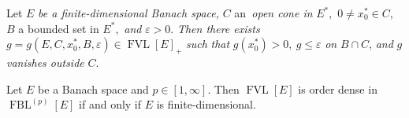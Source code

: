 \documentclass[10pt,a4paper]{amsart}
\begin{document}
\begin{lemma}
\textit{\label{F}}Let $E$ \textit{be a finite-dimensional Banach space, }$C$
an\textit{\ open cone in} $E^{\ast},$ $0\neq x_{0}^{\ast}\in C$, $B$ a bounded
set in $E^{\ast},$ \textit{and }$\varepsilon>0$. \textit{Then there exists}
$g=g\left(  E,C,x_{0}^{\ast},B,\varepsilon\right)  \in\operatorname*{FVL}%
[E]_{+}$ \textit{such} \textit{that} $g(x_{0}^{\ast})>0,\ g\leq\varepsilon$
\textit{on} $B\cap C$, \textit{and} $g$ \textit{vanishes outside} $C$.
\end{lemma}

\begin{theorem}
\label{Main}Let $E$ be a Banach space and $p\in\left[  1,\infty\right]  .$
Then $\operatorname*{FVL}\left[  E\right]  $ is order dense in
$\operatorname*{FBL}\nolimits^{(p)}\left[  E\right]  $ if and only if $E$ is finite-dimensional.
\end{theorem}
\end{document}
